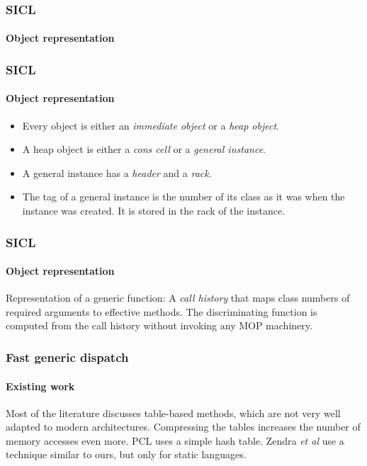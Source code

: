 \documentclass{beamer}
\def\inputfig#1{}
\begin{document}
\begin{frame}
  \frametitle{SICL}
  \framesubtitle{Object representation}
  \begin{center}
\inputfig{fig-representation.pdf_t}
  \end{center}

\end{frame}
\begin{frame}
  \frametitle{SICL}
  \framesubtitle{Object representation}

  \begin{itemize}
  \item Every object is either an \emph{immediate object} or a
    \emph{heap object}.
  \item A heap object is either a \emph{cons cell} or a \emph{general
    instance}.
  \item A general instance has a \emph{header} and a \emph{rack}.
  \item The tag of a general instance is the number of its class as it
    was when the instance was created.  It is stored in the rack of
    the instance.
  \end{itemize}

\end{frame}
\begin{frame}
  \frametitle{SICL}
  \framesubtitle{Object representation}

  Representation of a generic function:
  \vskip 0.25cm
  A \emph{call history} that maps class numbers of required arguments
  to effective methods. 
  \vskip 0.25cm
  The discriminating function is computed from the call history
  without invoking any MOP machinery. 

\end{frame}
\begin{frame}
  \frametitle{Fast generic dispatch}
  \framesubtitle{Existing work}

  Most of the literature discusses table-based methods, which are not
  very well adapted to modern architectures.  Compressing the tables
  increases the number of memory accesses even more.
  \vskip 0.5cm
  PCL uses a simple hash table.
  \vskip 0.5cm
  Zendra \emph{et al} use a technique similar to ours, but only for
  static languages.

\end{frame}
\end{document}
